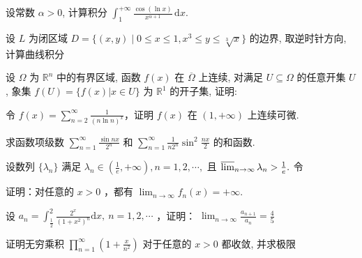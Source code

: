 设常数 $\alpha > 0$, 计算积分 $\int_{1}^{+\infty} \frac{\cos(\ln x)}{x^{\alpha + 1}} \, \mathrm{d}x$.\par
\par{}
设 $L$ 为闭区域 $D = \{(x, y) \mid 0 \leq x \leq 1, x^3 \leq y \leq \sqrt[3]{x}\}$ 的边界, 取逆时针方向, 计算曲线积分\par
\nopagebreak[4]
\par{}
设 $\Omega$ 为 $\mathbb{R}^n$ 中的有界区域, 函数 $f(x)$ 在 $\overline{\Omega}$ 上连续, 对满足 $U \subseteq \Omega$ 的任意开集 $U$, 象集 $f(U) = \{f(x) | x \in U\}$ 为 $\mathbb{R}^1$ 的开子集, 证明:\par
\nopagebreak[4]
令 $f(x) = \sum_{n=2}^{\infty} \frac{1}{(n \ln n)^x}$，证明 $f(x)$ 在 $(1, +\infty)$ 上连续可微.\par
求函数项级数 $\sum_{n=1}^{\infty} \frac{\sin nx}{2^n}$ 和 $\sum_{n=1}^{\infty} \frac{1}{n2^n} \sin^2 \frac{nx}{2}$ 的和函数.\par
\par{}
设数列  $\{\lambda_{n}\}$  满足  $\lambda_{n}\in\left(\frac{1}{e},+\infty\right), n=1,2,\cdots,$  且  $\varlimsup_{n\to\infty}\lambda_{n}>\frac{1}{e}.$  令\par
\nopagebreak[4]
证明：对任意的 $x > 0$ ，都有 $\lim_{n\to \infty}f_n(x) = +\infty .$\par
设  $a_{n}=\int_{\frac{1}{2}}^{2}\frac{2^{x}}{(1+x^{2})^{n}}\mathrm{d}x,\ n=1,2,\cdots$ ，证明： $\lim_{n\to\infty}\frac{a_{n+1}}{a_{n}}=\frac{4}{5}$\par
\par{}
证明无穷乘积 $\prod_{n=1}^{\infty}\left(1 + \frac{x}{n^2}\right)$ 对于任意的 $x > 0$ 都收敛, 并求极限\par
\nopagebreak[4]
